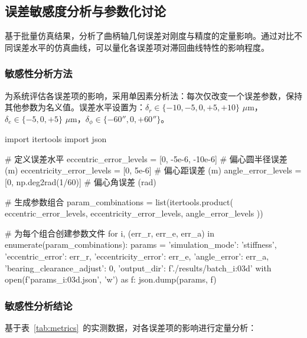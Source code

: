 \documentclass[12pt]{ctexart}
\begin{document}
\subsection{误差敏感度分析与参数化讨论}
基于批量仿真结果，分析了曲柄轴几何误差对刚度与精度的定量影响。通过对比不同误差水平的仿真曲线，可以量化各误差项对滞回曲线特性的影响程度。

\subsubsection{敏感性分析方法}
为系统评估各误差项的影响，采用单因素分析法：每次仅改变一个误差参数，保持其他参数为名义值。误差水平设置为：$\delta_r \in \{-10, -5, 0, +5, +10\}$ $\mu$m，$\delta_e \in \{-5, 0, +5\}$ $\mu$m，$\delta_\phi \in \{-60'', 0, +60''\}$。

\begin{pythoncode}[批量仿真参数生成示例]
import itertools
import json

# 定义误差水平
eccentric_error_levels = [0, -5e-6, -10e-6]  # 偏心圆半径误差 (m)
eccentricity_error_levels = [0, 5e-6]  # 偏心距误差 (m)
angle_error_levels = [0, np.deg2rad(1/60)]  # 偏心角误差 (rad)

# 生成参数组合
param_combinations = list(itertools.product(
    eccentric_error_levels,
    eccentricity_error_levels,
    angle_error_levels
))

# 为每个组合创建参数文件
for i, (err_r, err_e, err_a) in enumerate(param_combinations):
    params = {
        'simulation_mode': 'stiffness',
        'eccentric_error': err_r,
        'eccentricity_error': err_e,
        'angle_error': err_a,
        'bearing_clearance_adjust': 0,
        'output_dir': f'./results/batch_{i:03d}'
    }
    with open(f'params_{i:03d}.json', 'w') as f:
        json.dump(params, f)
\end{pythoncode}

\subsubsection{敏感性分析结论}
基于表~\ref{tab:metrics}~的实测数据，对各误差项的影响进行定量分析：
\end{document}
